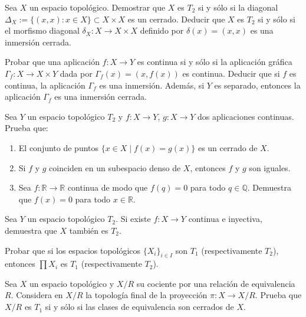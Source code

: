 \begin{ejer}[98]
Sea $X$ un espacio topológico. Demostrar que $X$ es $T_2$ si y sólo si la diagonal $\Delta_X := \{(x,x) : x \in X\} \subset X \times X$ es un cerrado. Deducir que $X$ es $T_2$ si y sólo si el morfismo diagonal $\delta_X \colon X \to X \times X$ definido por $\delta(x) = (x,x)$ es una inmersión cerrada.
\end{ejer}

\begin{ejer}[99]
Probar que una aplicación $f \colon X \to Y$ es continua si y sólo si la aplicación gráfica $\Gamma_f \colon X \to X \times Y$ dada por $\Gamma_f(x) = (x, f(x))$ es continua. Deducir que si $f$ es continua, la aplicación $\Gamma_f$ es una inmersión. Además, si $Y$ es separado, entonces la aplicación $\Gamma_f$ es una inmersión cerrada.
\end{ejer}

\begin{ejer}[100]
Sea $Y$ un espacio topológico $T_2$ y $f \colon X \to Y$, $g \colon X \to Y$ dos aplicaciones continuas. Prueba que:
\begin{enumerate}
    \item[a)] El conjunto de puntos $\{x \in X \mid f(x) = g(x)\}$ es un cerrado de $X$.
    \item[b)] Si $f$ y $g$ coinciden en un subespacio denso de $X$, entonces $f$ y $g$ son iguales.
    \item[c)] Sea $f \colon \mathbb{R} \to \mathbb{R}$ continua de modo que $f(q) = 0$ para todo $q \in \mathbb{Q}$. Demuestra que $f(x) = 0$ para todo $x \in \mathbb{R}$.
\end{enumerate}
\end{ejer}

\begin{ejer}[101]
Sea $Y$ un espacio topológico $T_2$. Si existe $f \colon X \to Y$ continua e inyectiva, demuestra que $X$ también es $T_2$.
\end{ejer}

\begin{ejer}[102]
Probar que si los espacios topológicos $\{X_i\}_{i \in I}$ son $T_1$ (respectivamente $T_2$), entonces $\prod X_i$ es $T_1$ (respectivamente $T_2$).
\end{ejer}

\begin{ejer}[103]
Sea $X$ un espacio topológico y $X/R$ su cociente por una relación de equivalencia $R$. Considera en $X/R$ la topología final de la proyección $\pi \colon X \to X/R$. Prueba que $X/R$ es $T_1$ si y sólo si las clases de equivalencia son cerrados de $X$.
\end{ejer}

